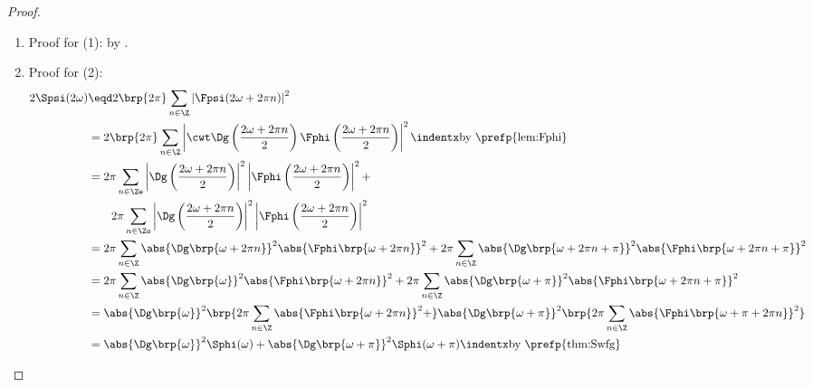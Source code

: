 \begin{proof}
\begin{enumerate}

\item Proof for (1): by .

\item Proof for (2):
\begin{align*}
   2\Spsi(2\omega)
     &\eqd 2\brp{2\pi}\sum_{n\in\Z} \left|\Fpsi(2\omega+2\pi n)\right|^2
   \\&= 2\brp{2\pi}\sum_{n\in\Z} \left|\cwt \Dg\left(\frac{2\omega+2\pi n}{2}\right)\Fphi\left(\frac{2\omega+2\pi n}{2}\right)\right|^2
        \indentx\text{by \prefp{lem:Fphi}}
   \\&= 2\pi
        \sum_{n\in\Ze} \left|\Dg\left(\frac{2\omega+2\pi n}{2}\right)\right|^2\left|\Fphi\left(\frac{2\omega+2\pi n}{2}\right)\right|^2 +
     \\&\qquad 2\pi
        \sum_{n\in\Zo} \left|\Dg\left(\frac{2\omega+2\pi n}{2}\right)\right|^2\left|\Fphi\left(\frac{2\omega+2\pi n}{2}\right)\right|^2
   \\&= 2\pi\sum_{n\in\Z} \abs{\Dg\brp{\omega+2\pi n     }}^2 \abs{\Fphi\brp{\omega+2\pi n       }}^2 +
        2\pi\sum_{n\in\Z} \abs{\Dg\brp{\omega+2\pi n+\pi }}^2 \abs{\Fphi\brp{\omega+2\pi n + \pi }}^2  
   \\&= 2\pi\sum_{n\in\Z} \abs{\Dg\brp{\omega            }}^2 \abs{\Fphi\brp{\omega+2\pi n       }}^2 +
        2\pi\sum_{n\in\Z} \abs{\Dg\brp{\omega+\pi        }}^2 \abs{\Fphi\brp{\omega+2\pi n + \pi }}^2  
   \\&= \abs{\Dg\brp{\omega     }}^2 \brp{2\pi\sum_{n\in\Z} \abs{\Fphi\brp{\omega+2\pi n       }}^2 +}
        \abs{\Dg\brp{\omega+\pi }}^2 \brp{2\pi\sum_{n\in\Z} \abs{\Fphi\brp{\omega+\pi+2\pi n   }}^2  }
   \\&= \abs{\Dg\brp{\omega     }}^2\Sphi(\omega) +
        \abs{\Dg\brp{\omega+\pi }}^2 \Sphi(\omega+\pi)
        \indentx\text{by \prefp{thm:Swfg}}
\end{align*}



\end{enumerate}
\end{proof}
